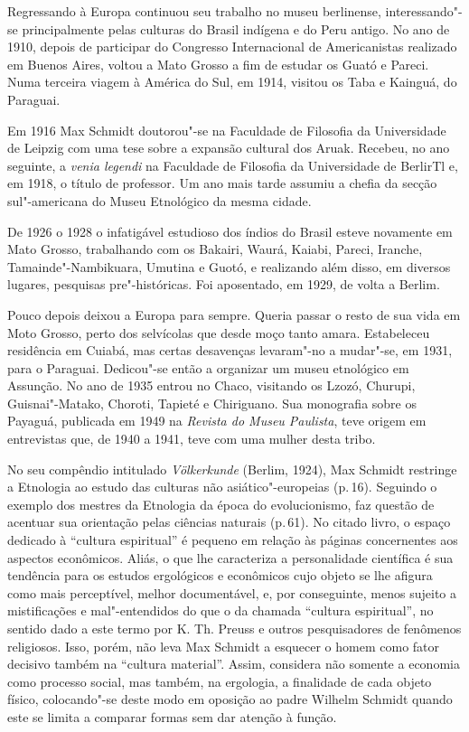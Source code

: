 Regressando à Europa continuou seu trabalho no museu berlinense,
interessando"-se principalmente pelas culturas do Brasil indígena e do
Peru antigo. No ano de 1910, depois de participar do Congresso
Internacional de Americanistas realizado em Buenos Aires, voltou a Mato
Grosso a fim de estudar os Guató e Pareci. Numa terceira viagem à
América do Sul, em 1914, visitou os Taba e Kainguá, do Paraguai.

Em 1916 Max Schmidt doutorou"-se na Faculdade de Filosofia da
Universidade de Leipzig com uma tese sobre a expansão cultural dos
Aruak. Recebeu, no ano seguinte, a \textit{venia legendi} na Faculdade de
Filosofia da Universidade de BerlirTl e, em 1918, o título de professor.
Um ano mais tarde assumiu a chefia da secção sul"-americana do Museu
Etnológico da mesma cidade.

De 1926 o 1928 o infatigável estudioso dos índios do Brasil esteve
novamente em Mato Grosso, trabalhando com os Bakairi, Waurá, Kaiabi,
Pareci, Iranche, Tamainde"-Nambikuara, Umutina e Guotó, e realizando além
disso, em diversos lugares, pesquisas pre"-históricas. Foi aposentado, em
1929, de volta a Berlim.

Pouco depois deixou a Europa para sempre. Queria passar o resto de sua
vida em Moto Grosso, perto dos selvícolas que desde moço tanto amara.
Estabeleceu residência em Cuiabá, mas certas desavenças levaram"-no a
mudar"-se, em 1931, para o Paraguai. Dedicou"-se então a organizar um
museu etnológico em Assunção. No ano de 1935 entrou no Chaco, visitando
os Lzozó, Churupi, Guisnai"-Matako, Choroti, Tapieté e Chiriguano. Sua
monografia sobre os Payaguá, publicada em 1949 na \textit{Revista do Museu
Paulista}, teve origem em entrevistas que, de 1940 a 1941, teve com uma
mulher desta tribo.


No seu compêndio intitulado \textit{Völkerkunde} (Berlim, 1924), Max
Schmidt restringe a Etnologia ao estudo das culturas não
asiático"-europeias (p.\,16). Seguindo o exemplo dos mestres da Etnologia
da época do evolucionismo, faz questão de acentuar sua orientação pelas
ciências naturais (p.\,61). No citado livro, o espaço dedicado à
``cultura espiritual'' é pequeno em relação às páginas concernentes aos
aspectos econômicos. Aliás, o que lhe caracteriza a personalidade
científica é sua tendência para os estudos ergológicos e econômicos cujo
objeto se lhe afigura como mais perceptível, melhor documentável, e, por
conseguinte, menos sujeito a mistificações e mal"-entendidos do que o da
chamada ``cultura espiritual'', no sentido dado a este termo por K. Th.
Preuss e outros pesquisadores de fenômenos religiosos. Isso, porém, não
leva Max Schmidt a esquecer o homem como fator decisivo também na
``cultura material''. Assim, considera não somente a economia como
processo social, mas também, na ergologia, a finalidade de cada objeto
físico, colocando"-se deste modo em oposição ao padre Wilhelm Schmidt
quando este se limita a comparar formas sem dar atenção à função.


